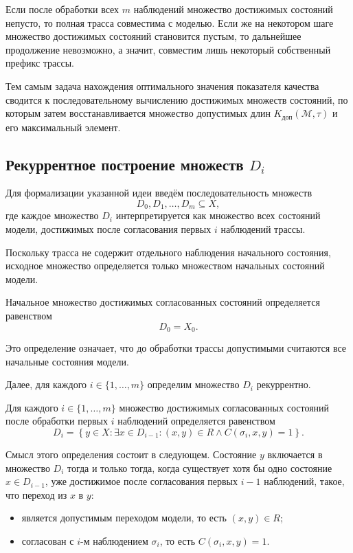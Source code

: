 Если после обработки всех $m$ наблюдений множество достижимых состояний
непусто, то полная трасса совместима с моделью. Если же на некотором шаге
множество достижимых состояний становится пустым, то дальнейшее продолжение
невозможно, а значит, совместим лишь некоторый собственный префикс трассы.

Тем самым задача нахождения оптимального значения показателя качества сводится
к последовательному вычислению достижимых множеств состояний, по которым затем
восстанавливается множество допустимых длин
$K_{\mathrm{доп}}(\mathcal{M},\tau)$ и его максимальный элемент.

\subsection{Рекуррентное построение множеств $D_i$}

Для формализации указанной идеи введём последовательность множеств
\[
D_0, D_1, \dots, D_m \subseteq X,
\]
где каждое множество $D_i$ интерпретируется как множество всех состояний
модели, достижимых после согласования первых $i$ наблюдений трассы.

Поскольку трасса не содержит отдельного наблюдения начального состояния,
исходное множество определяется только множеством начальных состояний модели.

\begin{definition}\label{def:d0}
Начальное множество достижимых согласованных состояний определяется равенством
\begin{equation}\label{f14}
D_0 = X_0.
\end{equation}
\end{definition}

Это определение означает, что до обработки трассы допустимыми считаются все
начальные состояния модели.

Далее, для каждого $i \in \{1,\dots,m\}$ определим множество $D_i$ рекуррентно.

\begin{definition}\label{def:di}
Для каждого $i \in \{1,\dots,m\}$ множество достижимых согласованных состояний
после обработки первых $i$ наблюдений определяется равенством
\begin{equation}\label{f15}
D_i
=
\left\{
y \in X
:
\exists x \in D_{i-1} : (x,y) \in R \land C(\sigma_i,x,y)=1
\right\}.
\end{equation}
\end{definition}

Смысл этого определения состоит в следующем. Состояние $y$ включается в
множество $D_i$ тогда и только тогда, когда существует хотя бы одно состояние
$x \in D_{i-1}$, уже достижимое после согласования первых $i-1$ наблюдений,
такое, что переход из $x$ в $y$:
\begin{itemize}
    \item является допустимым переходом модели, то есть $(x,y) \in R$;
    \item согласован с $i$-м наблюдением $\sigma_i$, то есть
    $C(\sigma_i,x,y)=1$.
\end{itemize}

